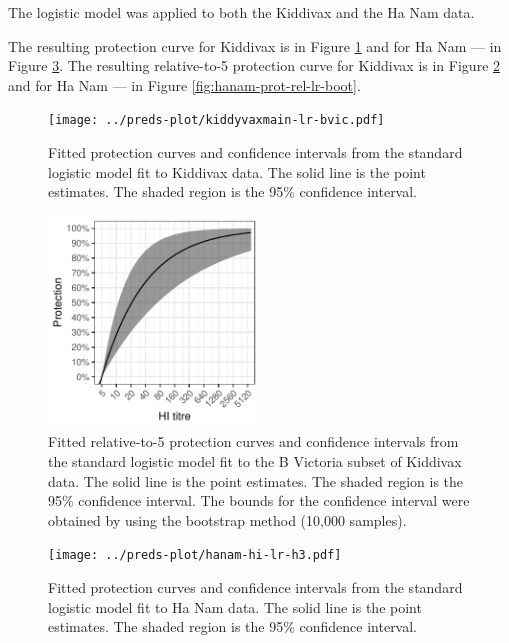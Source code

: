 The logistic model was applied to both the Kiddivax and the Ha Nam data.

The resulting protection curve for Kiddivax is in Figure \ref{fig:kiddyvaxmain-prot-lr} and for Ha Nam --- in Figure \ref{fig:hanam-prot-lr}. The resulting relative-to-5 protection curve for Kiddivax is in Figure \ref{fig:kiddyvaxmain-prot-rel-lr-boot} and for Ha Nam --- in Figure \ref{fig:hanam-prot-rel-lr-boot}.

\begin{figure}[htp]
    \centering
    \texttt{[image: ../preds-plot/kiddyvaxmain-lr-bvic.pdf]}
    \caption{
        Fitted protection curves and confidence intervals from the standard logistic model fit to Kiddivax data. The solid line is the point estimates. The shaded region is the 95\% confidence interval.
    }
    \label{fig:kiddyvaxmain-prot-lr}
\end{figure}

\begin{figure}[htp]
    \centering
    \includegraphics[width=0.5\textwidth]{../fit-logistic-boot-plot/kiddyvaxmain-bvic-prot-rel.pdf}
    \caption{
        Fitted relative-to-5 protection curves and confidence intervals from the standard logistic model fit to the B Victoria subset of Kiddivax data. The solid line is the point estimates. The shaded region is the 95\% confidence interval. The bounds for the confidence interval were obtained by using the bootstrap method (10,000 samples).
    }
    \label{fig:kiddyvaxmain-prot-rel-lr-boot}
\end{figure}

\begin{figure}[htp]
    \centering
    \texttt{[image: ../preds-plot/hanam-hi-lr-h3.pdf]}
    \caption{
        Fitted protection curves and confidence intervals from the standard logistic model fit to Ha Nam data. The solid line is the point estimates. The shaded region is the 95\% confidence interval.
    }
    \label{fig:hanam-prot-lr}
\end{figure}


